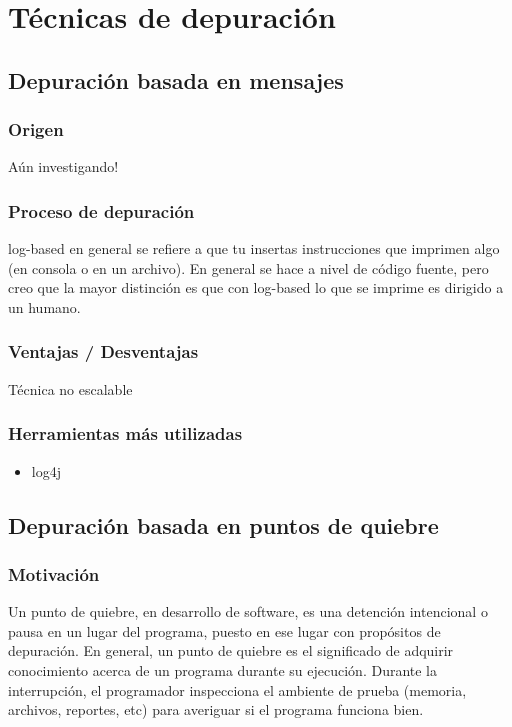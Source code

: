 \documentclass[12pt,a4paper]{report}
\begin{document}
	\section{Técnicas de depuración}
		\subsection{Depuración basada en mensajes}
			\subsubsection{Origen}

Aún investigando!

			\subsubsection{Proceso de depuración}

log-based en general se refiere a que tu insertas instrucciones que imprimen algo (en consola o en un archivo). En general se hace a nivel de código fuente, pero creo que la mayor distinción es que con log-based lo que se imprime es dirigido a un humano.

			\subsubsection{Ventajas / Desventajas}

Técnica no escalable

			\subsubsection{Herramientas más utilizadas}
\begin{itemize}
	\item log4j
\end{itemize}

		\subsection{Depuración basada en puntos de quiebre}
			\subsubsection{Motivación}

Un punto de quiebre, en desarrollo de software, es una detención intencional o pausa en un lugar del programa, puesto en ese lugar con propósitos de depuración.  En general, un punto de quiebre es el significado de adquirir conocimiento acerca de un programa durante su ejecución.  Durante la interrupción, el programador inspecciona el ambiente de prueba (memoria, archivos, reportes, etc) para averiguar si el programa funciona bien.
\end{document}
